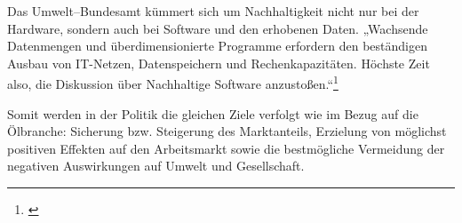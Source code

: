 Das Umwelt--Bundesamt kümmert sich um Nachhaltigkeit nicht nur bei der Hardware, sondern auch bei Software und den erhobenen Daten. „Wachsende Datenmengen und überdimensionierte Programme erfordern den beständigen Ausbau von IT-Netzen, Datenspeichern und Rechenkapazitäten. Höchste Zeit also, die Diskussion über Nachhaltige Software anzustoßen.“\footnote{\cite{fns}} 

Somit werden in der Politik die gleichen Ziele verfolgt wie im Bezug auf die Ölbranche: Sicherung bzw. Steigerung des Marktanteils, Erzielung von möglichst positiven Effekten auf den Arbeitsmarkt sowie die bestmögliche Vermeidung der negativen Auswirkungen auf Umwelt und Gesellschaft.